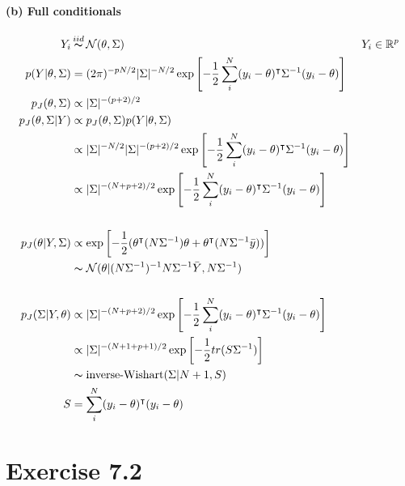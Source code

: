 \documentclass[11pt, letterpaper]{article}
\begin{document}
\paragraph{(b) Full conditionals}
\begin{align*}
    Y_i &\mathop{\thicksim}^{iid} \mathcal{N}(\theta, \Sigma) && Y_i \in \mathbb{R}^p \\
    p(Y|\theta, \Sigma) &=
        (2\pi)^{-pN/2} |\Sigma|^{-N/2} 
        \exp \left[ -\frac{1}{2} \sum_i^N (y_i-\theta)^{\intercal} \Sigma^{-1} (y_i-\theta) \right] \\
    p_J(\theta, \Sigma) &\propto |\Sigma|^{-(p+2)/2} \\
    p_J(\theta, \Sigma|Y) &\propto p_J(\theta, \Sigma) p(Y|\theta, \Sigma) \\
        &\propto |\Sigma|^{-N/2} |\Sigma|^{-(p+2)/2}
            \exp \left[ -\frac{1}{2} \sum_i^N (y_i-\theta)^{\intercal} \Sigma^{-1} (y_i-\theta) \right] \\
        &\propto |\Sigma|^{-(N+p+2)/2} 
            \exp \left[ -\frac{1}{2} \sum_i^N (y_i-\theta)^{\intercal} \Sigma^{-1} (y_i-\theta) \right] \\ \\
    p_J(\theta|Y, \Sigma) &\propto \exp \left[
            -\frac{1}{2} (\theta^{\intercal}(N\Sigma^{-1})\theta
            + \theta^{\intercal}(N\Sigma^{-1} \bar{y}))
        \right] \\
        &\thicksim \mathcal{N}(\theta|(N\Sigma^{-1})^{-1}N\Sigma^{-1} \bar{Y}, N\Sigma^{-1}) \\ \\
    p_J(\Sigma|Y, \theta) &\propto |\Sigma|^{-(N+p+2)/2} 
            \exp \left[ -\frac{1}{2} \sum_i^N (y_i-\theta)^{\intercal} \Sigma^{-1} (y_i-\theta) \right] \\
        &\propto |\Sigma|^{-(N+1+p+1)/2} \exp \left[ -\frac{1}{2} tr(S \Sigma^{-1}) \right] \\
        &\thicksim \text{inverse-Wishart}(\Sigma | N+1, S) \\
    S &= \sum_i^N (y_i - \theta)^{\intercal} (y_i - \theta)
\end{align*}

\newpage
\section{Exercise 7.2}
\end{document}
